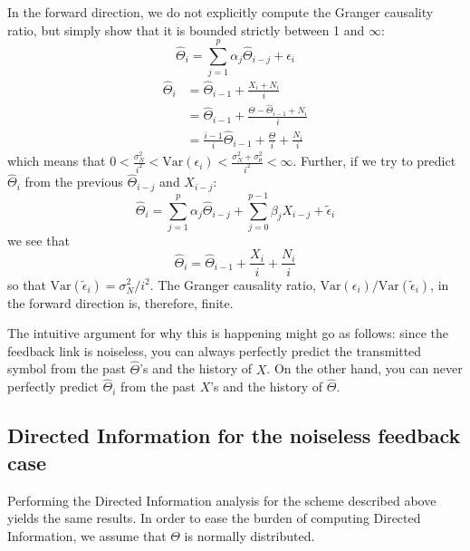 \documentclass[letterpaper, 10pt, conference]{ieeeconf}
\begin{document}
In the forward direction, we do not explicitly compute the Granger causality ratio, but simply show that it is bounded strictly between 1 and $\infty$:
\begin{equation}
	\widehat\Theta_i = \sum_{j=1}^p{\alpha_j \widehat\Theta_{i-j}} + \epsilon_i \label{eq:ar-model-theta-theta}
\end{equation}
\begin{align*}
	\widehat\Theta_i &= \widehat\Theta_{i-1} + \frac{X_i + N_i}{i} \\
					 &= \widehat\Theta_{i-1} + \frac{\Theta - \widehat\Theta_{i-1} + N_i}{i} \\
					 &= \frac{i-1}{i} \widehat\Theta_{i-1} + \frac{\Theta}{i} + \frac{N_i}{i}
\end{align*}
which means that $0 < \frac{\sigma_N^2}{i^2} < \text{Var}(\epsilon_i) < \frac{\sigma_N^2 + \sigma_\theta^2}{i^2} < \infty$.
Further, if we try to predict $\widehat\Theta_i$ from the previous $\widehat\Theta_{i-j}$ and $X_{i-j}$:
\begin{equation}
	\widehat\Theta_i = \sum_{j=1}^{p}{\alpha_j \widehat\Theta_{i-j}} + \sum_{j=0}^{p-1}{\beta_j X_{i-j}} + \tilde\epsilon_i \label{eq:ar-model-theta-theta-x}
\end{equation}
we see that
\begin{equation*}
	\widehat\Theta_i = \widehat\Theta_{i-1} + \frac{X_i}{i} + \frac{N_i}{i}
\end{equation*}
so that $\text{Var}(\tilde\epsilon_i) = \sigma_N^2/i^2$. The Granger causality ratio, $\text{Var}(\epsilon_i) / \text{Var}(\tilde\epsilon_i)$, in the forward direction is, therefore, finite.

The intuitive argument for why this is happening might go as follows: since the feedback link is noiseless, you can always perfectly predict the transmitted symbol from the past $\widehat\Theta$'s and the history of $X$. On the other hand, you can never perfectly predict $\widehat\Theta_i$ from the past $X$'s and the history of $\widehat\Theta$.


\subsection{Directed Information for the noiseless feedback case}
\label{sec:dir-info-noiseless}

Performing the Directed Information analysis for the scheme described above yields the same results. In order to ease the burden of computing Directed Information, we assume that $\Theta$ is normally distributed.
\end{document}
